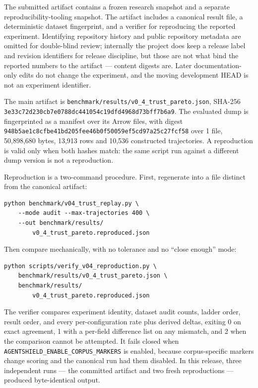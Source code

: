\documentclass[letterpaper,twocolumn,10pt]{article}
\newcommand{\hb}{\allowbreak}
\begin{document}
The submitted artifact contains a frozen research snapshot and a separate
reproducibility-tooling snapshot. The artifact includes a canonical result
file, a deterministic dataset fingerprint, and a verifier for reproducing the
reported experiment. Identifying repository history and public repository
metadata are omitted for double-blind review; internally the project does keep
a release label and revision identifiers for release discipline, but those are
not what bind the reported numbers to the artifact --- content digests are.
Later documentation-only edits do not change the experiment, and the moving
development HEAD is not an experiment identifier.

The main artifact is \texttt{benchmark/results/v0\_4\_trust\_pareto.json},
SHA-256 \texttt{3e33\hb c72d\hb 230c\hb b7e0\hb 788d\hb c441\hb 2574\hb 054c\hb 19df\hb d496\hb 5465\hb 7369\hb 8d73\hb bff7\hb b6a9\hb 0565}.
The evaluated dump is fingerprinted as a manifest over its Arrow files, with
digest \texttt{948b\hb 9432\hb 5ae1\hb c8cf\hb be41\hb bd20\hb 5fee\hb 46b0\hb f500\hb 2155\hb 59ef\hb 5cd9\hb 7a25\hb c27f\hb cf58\hb 0049}
over 1 file, 50,898,680 bytes, 13,913 rows and 10,536 constructed trajectories.
A reproduction is valid only when both hashes match: the same script run against
a different dump version is not a reproduction.

Reproduction is a two-command procedure. First, regenerate into a file distinct
from the canonical artifact:

{\small
\begin{verbatim}
python benchmark/v04_trust_replay.py \
    --mode audit --max-trajectories 400 \
    --out benchmark/results/
        v0_4_trust_pareto.reproduced.json
\end{verbatim}
}

Then compare mechanically, with no tolerance and no ``close enough'' mode:

{\small
\begin{verbatim}
python scripts/verify_v04_reproduction.py \
    benchmark/results/v0_4_trust_pareto.json \
    benchmark/results/
        v0_4_trust_pareto.reproduced.json
\end{verbatim}
}

The verifier compares experiment identity, dataset audit counts, ladder order,
result order, and every per-configuration rate plus derived deltas, exiting 0 on
exact agreement, 1 with a per-field difference list on any mismatch, and 2 when
the comparison cannot be attempted. It fails closed when
\texttt{AGENTSHIELD\_ENABLE\_CORPUS\_MARKERS} is enabled, because
corpus-specific markers change scoring and the canonical run had them disabled.
In this release, three independent runs --- the committed artifact and two fresh
reproductions --- produced byte-identical output.
\end{document}
